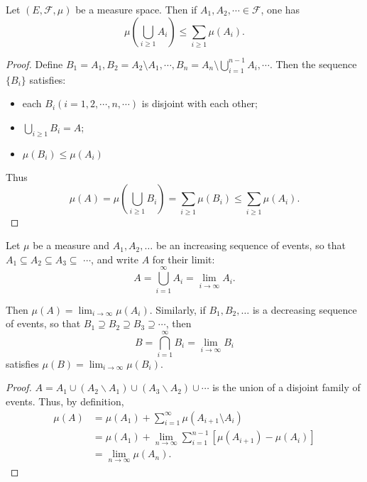 \documentclass[11pt,singlecolumn, openany, citestyle=authoryear]{elegantbook}
\begin{document}
\begin{CJK}{UTF8}{gbsn}
\begin{lemma}
    Let $(E,\mathcal{F},\mu)$ be a measure space. Then if $A_1,A_2,\cdots \in \mathcal{F}$, one has 
        $$
        \mu(\bigcup_{i\geqslant 1}A_i) \leqslant \sum_{i \geqslant 1}\mu(A_i).
        $$
\end{lemma}
\begin{proof}
    Define $B_1=A_1,B_2=A_2\setminus A_1,\cdots,
    B_n=A_n\setminus \displaystyle \bigcup_{i=1}^{n-1}A_i,\cdots$.
    Then the sequence $\{B_i\}$ satisfies:
    \begin{itemize}
    \item each $B_i (i=1,2,\cdots,n,\cdots)$ is disjoint with each other;
    \item $\displaystyle \bigcup_{i\geqslant 1} B_i = A$; 
    \item $\mu(B_i)\leqslant \mu(A_i)$
    \end{itemize}
    Thus 
    $$
    \mu(A)=\mu(\bigcup_{i\geqslant 1}B_i)=\sum_{i\geqslant 1}\mu(B_i)\leqslant 
    \sum_{i\geqslant 1}\mu(A_i).
    $$
\end{proof}

\begin{theorem}
    Let $\mu$ be a measure and $A_1, A_2, \ldots$ be an increasing sequence of events, so that 
    $A_1 \subseteq A_2 \subseteq A_3 \subseteq$ $\cdots$, and write $A$ for their limit:
    $$
    A=\bigcup_{i=1}^{\infty} A_i=\lim _{i \rightarrow \infty} A_i.
    $$
    
    Then $\displaystyle \mu(A)=\lim _{i \rightarrow \infty} \mu\left(A_i\right)$.
    Similarly, if $B_1, B_2, \ldots$ is a decreasing sequence of events, so that $B_1 \supseteq B_2 \supseteq B_3 \supseteq \cdots$, then
    $$
    B=\bigcap_{i=1}^{\infty} B_i=\lim _{i \rightarrow \infty} B_i
    $$
    satisfies $\displaystyle \mu(B)=\lim _{i \rightarrow \infty} \mu\left(B_i\right)$.
\end{theorem}
\begin{proof}
    $A=A_1 \cup\left(A_2 \backslash A_1\right) \cup\left(A_3 \backslash A_2\right) \cup \cdots$ 
    is the union of a disjoint family of events. Thus, by definition,
$$
\begin{aligned}
\mu(A) & =\mu\left(A_1\right)+\sum_{i=1}^{\infty} \mu\left(A_{i+1}
 \setminus A_i\right) \\
& =\mu\left(A_1\right)+\lim _{n \rightarrow \infty} \sum_{i=1}^{n-1}
\left[\mu\left(A_{i+1}\right)-\mu\left(A_i\right)\right] \\
& =\lim _{n \rightarrow \infty} \mu\left(A_n\right) .
\end{aligned}
$$


\end{proof}
\end{CJK}
\end{document}
